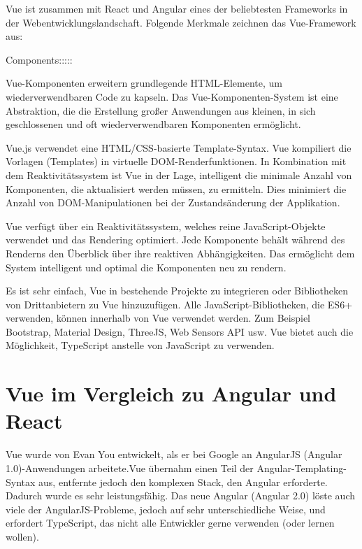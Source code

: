 Vue ist zusammen mit React und Angular eines der beliebtesten Frameworks in der Webentwicklungslandschaft. Folgende Merkmale zeichnen das Vue-Framework aus:
\begin{labeling}{Components:::::}
	\item [Components:] Vue-Komponenten erweitern grundlegende \gls{HTML}-Elemente, um wiederverwendbaren Code zu kapseln. Das Vue-Komponenten-System ist eine Abstraktion, die die Erstellung großer Anwendungen aus kleinen, in sich geschlossenen und oft wiederverwendbaren Komponenten ermöglicht.
	\item [Templates:] Vue.js verwendet eine HTML/\gls{CSS}-basierte Template-Syntax. Vue kompiliert  die Vorlagen (Templates) in virtuelle \gls{DOM}-Renderfunktionen. In Kombination mit dem Reaktivitätssystem ist Vue in der Lage, intelligent die minimale Anzahl von Komponenten, die aktualisiert werden müssen, zu ermitteln. Dies minimiert die Anzahl von DOM-Manipulationen bei der Zustandsänderung der Applikation.
	\item [Reaktivität:] Vue verfügt über ein Reaktivitätssystem, welches reine JavaScript-Objekte verwendet und das Rendering optimiert. Jede Komponente behält während des Renderns den Überblick über ihre reaktiven Abhängigkeiten. Das ermöglicht dem System intelligent und optimal die Komponenten neu zu rendern.
  \item [Integrierbarkeit:] Es ist sehr einfach, Vue in bestehende Projekte zu integrieren oder Bibliotheken von Drittanbietern zu Vue hinzuzufügen. Alle JavaScript-Bibliotheken, die ES6+ verwenden, können innerhalb von Vue verwendet werden. Zum Beispiel Bootstrap, Material Design, ThreeJS, Web Sensors API usw.  Vue bietet auch die Möglichkeit, TypeScript anstelle von JavaScript zu verwenden.
	
\end{labeling}
\cite{VueGuide:Online}

\section{Vue im Vergleich zu Angular und React}
\label{sec:Vue im Vergleich zu Angular und React}
 Vue wurde von Evan You entwickelt, als er bei Google an AngularJS (Angular 1.0)-Anwendungen arbeitete.Vue übernahm einen Teil der Angular-Templating-Syntax aus, entfernte jedoch den komplexen Stack, den Angular erforderte. Dadurch wurde es sehr leistungsfähig. Das neue Angular (Angular 2.0) löste auch viele der AngularJS-Probleme, jedoch auf sehr unterschiedliche Weise, und erfordert TypeScript, das nicht alle Entwickler gerne verwenden (oder lernen wollen).

